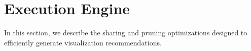 
\section{{\large \SeeDB} Execution Engine}
\label{sec:optimizer}

In this section, we describe the sharing and pruning optimizations designed
to efficiently generate visualization recommendations.



